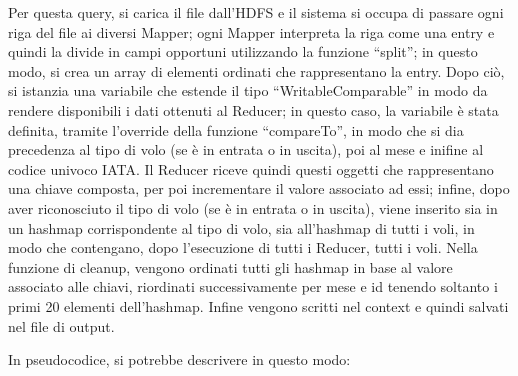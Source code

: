 \documentclass[11pt]{article} %
\begin{document}
Per questa query, si carica il file dall'HDFS e il sistema si occupa di passare ogni riga del file ai diversi Mapper; ogni Mapper interpreta la riga come una entry e quindi la divide in campi opportuni utilizzando la funzione ``split''; in questo modo, si crea un array di elementi ordinati che rappresentano la entry. Dopo ciò, si istanzia una variabile che estende il tipo ``WritableComparable'' in modo da rendere disponibili i dati ottenuti al Reducer; in questo caso, la variabile è stata definita, tramite l'override della funzione ``compareTo'',  in modo che si dia precedenza al tipo di volo (se è in entrata o in uscita), poi al mese e inifine al codice univoco IATA. Il Reducer riceve quindi questi oggetti che rappresentano una chiave composta, per poi incrementare il valore associato ad essi; infine, dopo aver riconosciuto il tipo di volo (se è in entrata o in uscita), viene inserito sia in un hashmap corrispondente al tipo di volo, sia all'hashmap di tutti i voli, in modo che contengano, dopo l'esecuzione di tutti i Reducer, tutti i voli. Nella funzione di cleanup, vengono ordinati tutti gli hashmap in base al valore associato alle chiavi, riordinati successivamente per mese e id tenendo soltanto i primi 20 elementi dell'hashmap. Infine vengono scritti nel context e quindi salvati nel file di output. 

In pseudocodice, si potrebbe descrivere in questo modo:

\newpage 
\end{document}
